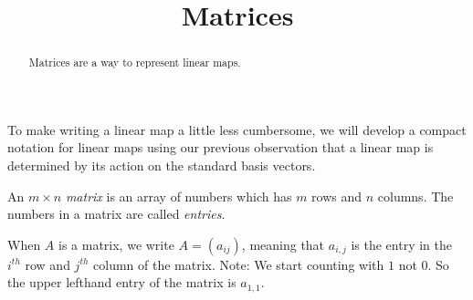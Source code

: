 \documentclass{ximera}
\title{Matrices}
\begin{document}
\begin{abstract}
  Matrices are a way to represent linear maps.
\end{abstract}

To make writing a linear map a little less cumbersome, we will develop a compact notation for linear maps using our previous observation that a linear 
map is determined by its action on the standard basis vectors.
	
\begin{definition}
  An $m \times n$ \textit{matrix} is an array of numbers which has $m$ rows and $n$ columns.  The numbers in a matrix are called \textit{entries}.

  When $A$ is a matrix, we write $A = (a_{ij})$, meaning that $a_{i,j}$ is the entry in the $i^{th}$  row and $j^{th}$ column of the matrix.  Note:  We start counting
  with $1$ not $0$.  So the upper lefthand entry of the matrix is $a_{1,1}$.
\end{definition}
\end{document}
